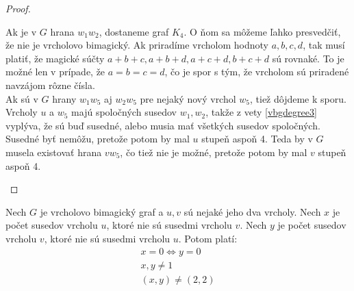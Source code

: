 \begin{proof}
\begin{enumerate}
Ak je v $G$ hrana $w_1 w_2$, dostaneme graf $K_4$. O ňom sa môžeme ľahko presvedčiť, že nie je vrcholovo bimagický. Ak priradíme vrcholom hodnoty $a,b,c,d$, tak musí platiť, že magické súčty $a+b+c, a+b+d, a+c+d, b+c+d$ sú rovnaké. To je možné len v prípade, že $a = b = c = d$, čo je spor s tým, že vrcholom sú priradené navzájom rôzne čísla. \\

Ak sú v $G$ hrany $w_1 w_5$ aj $w_2 w_5$ pre nejaký nový vrchol $w_5$, tiež dôjdeme k sporu. Vrcholy $u$ a $w_5$ majú spoločných susedov $w_1, w_2$, takže z vety \ref{vbgdegree3} vyplýva, že sú buď susedné, alebo musia mať všetkých susedov spoločných. Susedné byť nemôžu, pretože potom by mal $u$ stupeň aspoň 4. Teda by v $G$ musela existovať hrana $v w_5$, čo tiež nie je možné, pretože potom by mal $v$ stupeň aspoň 4.
\end{enumerate}

\end{proof}

\begin{theorem} Nech $G$ je vrcholovo bimagický graf a $u,v$ sú nejaké jeho dva vrcholy. Nech $x$ je počet susedov vrcholu $u$, ktoré nie sú susedmi vrcholu $v$. Nech $y$ je počet susedov vrcholu $v$, ktoré nie sú susedmi vrcholu $u$. Potom platí:
\begin{gather*}
\label{vbgcondition}
x = 0 \iff y = 0 \\
x,y \neq 1 \\
(x,y) \neq (2,2)
\end{gather*}
\end{theorem}

